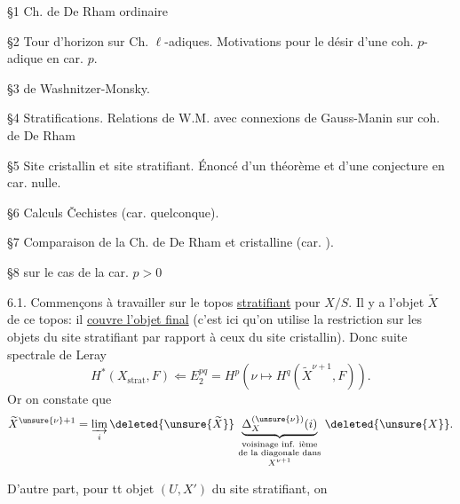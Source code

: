 \S 1 Ch. de De Rham ordinaire

\S 2 Tour d'horizon sur Ch. $\ell$-adiques. Motivations pour le désir d'une coh. $p$-adique en car. $p$.

\S 3  de Washnitzer-Monsky.

\S 4 Stratifications. Relations de W.M. avec connexions de Gauss-Manin sur coh. de De Rham

\S 5  Site cristallin et site stratifiant. Énoncé  d'un théorème et d'une conjecture en car. nulle.

\S 6 Calculs \v{C}echistes (car. quelconque).

\S 7 Comparaison de la Ch. de De Rham et cristalline (car. ).

\S 8   sur le cas de la car. $p>0$



6.1. Commençons à travailler sur le topos \uline{stratifiant} pour $X/S$. Il y a l'objet $\widetilde X$ de ce topos: il \uline{couvre l'objet final} (c'est ici qu'on utilise la restriction sur les objets du site stratifiant par rapport à ceux du site cristallin). Donc suite spectrale de Leray
\[
H^*(X_{\mathrm{strat}},F)\Longleftarrow E_2^{pq}
=H^p(\nu\mapsto H^q(\widetilde X^{\nu+1},F)).
\]
Or on constate que
\[
\widetilde X^{\unsure{\nu}+1}
=\varinjlim_i\deleted{\unsure{\widetilde X}}\,
\underbrace{\Delta_X^{(\unsure{\nu})}(i)}_{
\substack{\text{voisinage inf. ième}\\
\text{de la diagonale dans}\\
X^{\nu+1}}}
\,\deleted{\unsure{X}}.
\]

D'autre part, pour tt objet $(U,X')$ du site stratifiant, on 

